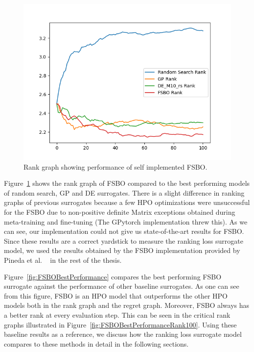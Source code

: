 \documentclass[12pt, twoside, ngerman]{report}
\begin{document}
\begin{figure}[h]
  \centering
    \includegraphics[scale=0.5]{images/FSBOPerformance}
    \caption{Rank graph showing performance of self implemented FSBO.}
    \label{fig:FSBOPerformance}
\end{figure}

Figure~\ref{fig:FSBOPerformance} shows the rank graph of FSBO compared to the best performing models of random search, GP and DE surrogates.
There is a slight difference in ranking graphs of previous surrogates because a few HPO optimizations were unsuccessful for the FSBO due to non-positive definite Matrix exceptions obtained during meta-training and fine-tuning (The GPytorch implementation threw this).
As we can see,  our implementation could not give us state-of-the-art results for FSBO.
Since these results are a correct yardstick to measure the ranking loss surrogate model, we used the results obtained by the FSBO implementation provided by Pineda et al. ~\cite{pineda2021hpob} in the rest of the thesis.


Figure~\ref{fig:FSBOBestPerformance} compares the best performing FSBO surrogate against the performance of other baseline surrogates.
As one can see from this figure, FSBO is an HPO model that outperforms the other HPO models both in the rank graph and the regret graph.
Moreover,  FSBO always has a better rank at every evaluation step.
This can be seen in the critical rank graphs illustrated in Figure~\ref{fig:FSBOBestPerformanceRank100}.
Using these baseline results as a reference, we discuss how the ranking loss surrogate model compares to these methods in detail in the following sections.
\end{document}

